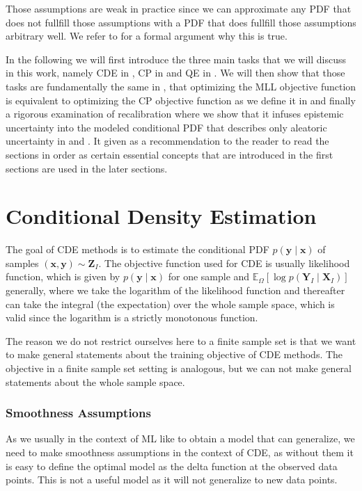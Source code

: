 Those assumptions are weak in practice since we can approximate any PDF that does not fullfill those assumptions with a PDF that does fullfill those assumptions arbitrary well. We refer to \cite{klenke2013probability} for a formal argument why this is true.

In the following we will first introduce the three main tasks that we will discuss in this work, namely CDE in , CP in  and QE in . We will then show that those tasks are fundamentally the same in , that optimizing the MLL objective function is equivalent to optimizing the CP objective function as we define it in  and finally a rigorous examination of recalibration where we show that it infuses epistemic uncertainty into the modeled conditional PDF that describes only aleatoric uncertainty in  and . It given as a recommendation to the reader to read the sections in order as certain essential concepts that are introduced in the first sections are used in the later sections.

\section{Conditional Density Estimation}\label{sec:cde}

The goal of CDE methods is to estimate the conditional PDF $p(\mathbf{y}\mid \mathbf{x})$ of samples $(\mathbf{x}, \mathbf{y}) \sim \mathbf{Z}_I$. The objective function used for CDE is usually likelihood function, which is given by $p(\mathbf{y}\mid \mathbf{x})$ for one sample and $\mathbb{E}_{\Omega}\left[\log p(\mathbf{Y}_I \mid \mathbf{X}_I)\right]$ generally, where we take the logarithm of the likelihood function and thereafter can take the integral (the expectation) over the whole sample space, which is valid since the logarithm is a strictly monotonous function.

The reason we do not restrict ourselves here to a finite sample set is that we want to make general statements about the training objective of CDE methods. The objective in a finite sample set setting is analogous, but we can not make general statements about the whole sample space. %

\subsubsection{Smoothness Assumptions}\label{sec:smoothness}
As we usually in the context of ML like to obtain a model that can generalize, we need to make smoothness assumptions in the context of CDE, as without them it is easy to define the optimal model as the delta function at the observed data points. This is not a useful model as it will not generalize to new data points.

